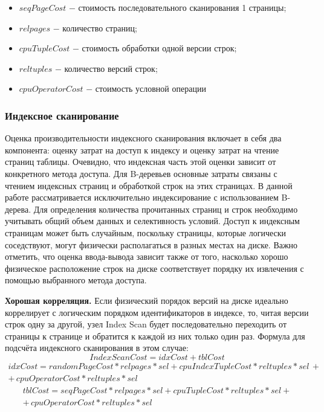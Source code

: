 \begin{itemize}
    \item $seqPageCost$ $-$ стоимость последовательного сканирования 1 страницы;
    \item $relpages$ $-$ количество страниц;
    \item $cpuTupleCost$ $-$ стоимость обработки одной версии строк;
    \item $reltuples$ $-$ количество версий строк;
    \item $cpuOperatorCost$ $-$ стоимость условной операции
\end{itemize}

\subsubsection{Индексное сканирование}

Оценка производительности индексного сканирования включает в себя два компонента: оценку затрат на доступ к индексу и оценку затрат на чтение страниц таблицы. Очевидно, что индексная часть этой оценки зависит от конкретного метода доступа. Для B-деревьев основные затраты связаны с чтением индексных страниц и обработкой строк на этих страницах. В данной работе рассматривается исключительно индексирование с использованием B-дерева. Для определения количества прочитанных страниц и строк необходимо учитывать общий объем данных и селективность условий. Доступ к индексным страницам может быть случайным, поскольку страницы, которые логически соседствуют, могут физически располагаться в разных местах на диске. Важно отметить, что оценка ввода-вывода зависит также от того, насколько хорошо физическое расположение строк на диске соответствует порядку их извлечения с помощью выбранного метода доступа.

\textbf{Хорошая корреляция.} Если физический порядок версий на диске идеально коррелирует с логическим порядком идентификаторов в индексе, то, читая версии строк одну за другой, узел Index Scan будет последовательно переходить от страницы к странице и обратится к каждой из них только один раз. Формула для подсчёта индексного сканирования в этом случае:
\begin{equation}
    IndexScanCost = idxCost +tblCost
\end{equation}
\begin{equation}
    \begin{array}{c}
        idxCost = randomPageCost * relpages * sel + cpuIndexTupleCost * reltuples * sel \, + \\
        + \, cpuOperatorCost * reltuples * sel
    \end{array}
\end{equation}
\begin{equation}
    \begin{array}{c}
         tblCost = seqPageCost * relpages * sel + cpuTupleCost * reltuples * sel + \\ 
         + \, cpuOperatorCost * reltuples * sel
    \end{array}
\end{equation}

